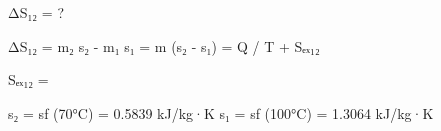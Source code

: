 ΔS₁₂ = ?  

ΔS₁₂ = m₂ s₂ - m₁ s₁ = m (s₂ - s₁) = Q / T + Sₑₓ₁₂  

Sₑₓ₁₂ =  

s₂ = sf (70°C) = 0.5839 kJ/kg·K  
s₁ = sf (100°C) = 1.3064 kJ/kg·K